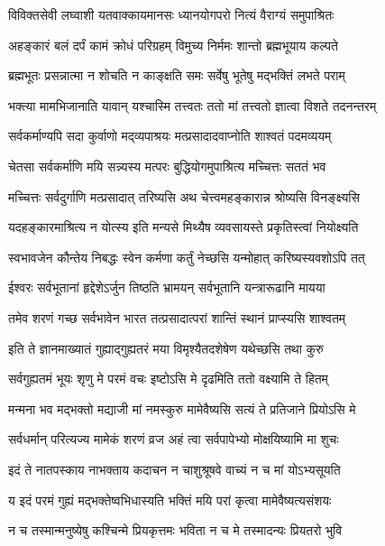 \twolineshloka
{विविक्तसेवी लघ्वाशी यतवाक्कायमानसः}
{ध्यानयोगपरो नित्यं वैराग्यं समुपाश्रितः}%

\twolineshloka
{अहङ्कारं बलं दर्पं कामं क्रोधं परिग्रहम्}
{विमुच्य निर्ममः शान्तो ब्रह्मभूयाय कल्पते}%

\twolineshloka
{ब्रह्मभूतः प्रसन्नात्मा न शोचति न काङ्क्षति}
{समः सर्वेषु भूतेषु मद्भक्तिं लभते पराम्}%

\twolineshloka
{भक्त्या मामभिजानाति यावान् यश्चास्मि तत्त्वतः}
{ततो मां तत्त्वतो ज्ञात्वा विशते तदनन्तरम्}%

\twolineshloka
{सर्वकर्माण्यपि सदा कुर्वाणो मद्‌व्यपाश्रयः}
{मत्प्रसादादवाप्नोति शाश्वतं पदमव्ययम्}%

\twolineshloka
{चेतसा सर्वकर्माणि मयि सन्न्यस्य मत्परः}
{बुद्धियोगमुपाश्रित्य मच्चित्तः सततं भव}%

\twolineshloka
{मच्चित्तः सर्वदुर्गाणि मत्प्रसादात् तरिष्यसि}
{अथ चेत्त्वमहङ्कारान्न श्रोष्यसि विनङ्क्ष्यसि}%

\twolineshloka
{यदहङ्कारमाश्रित्य न योत्स्य इति मन्यसे}
{मिथ्यैष व्यवसायस्ते प्रकृतिस्त्वां नियोक्ष्यति}%

\twolineshloka
{स्वभावजेन कौन्तेय निबद्धः स्वेन कर्मणा}
{कर्तुं नेच्छसि यन्मोहात् करिष्यस्यवशोऽपि तत्}%

\twolineshloka
{ईश्वरः सर्वभूतानां हृद्देशेऽर्जुन तिष्ठति}
{भ्रामयन् सर्वभूतानि यन्त्रारूढानि मायया}%

\twolineshloka
{तमेव शरणं गच्छ सर्वभावेन भारत}
{तत्प्रसादात्परां शान्तिं स्थानं प्राप्स्यसि शाश्वतम्}
{}%

\twolineshloka
{इति ते ज्ञानमाख्यातं गुह्याद्गुह्यतरं मया}
{विमृश्यैतदशेषेण यथेच्छसि तथा कुरु}%

\twolineshloka
{सर्वगुह्यतमं भूयः शृणु मे परमं वचः}
{इष्टोऽसि मे दृढमिति ततो वक्ष्यामि ते हितम्}%

\twolineshloka
{मन्मना भव मद्भक्तो मद्याजी मां नमस्कुरु}
{मामेवैष्यसि सत्यं ते प्रतिजाने प्रियोऽसि मे}%

\twolineshloka
{सर्वधर्मान् परित्यज्य मामेकं शरणं व्रज}
{अहं त्वा सर्वपापेभ्यो मोक्षयिष्यामि मा शुचः}%

\twolineshloka
{इदं ते नातपस्काय नाभक्ताय कदाचन}
{न चाशुश्रूषवे वाच्यं न च मां योऽभ्यसूयति}%

\twolineshloka
{य इदं परमं गुह्यं मद्भक्तेष्वभिधास्यति}
{भक्तिं मयि परां कृत्वा मामेवैष्यत्यसंशयः}%

\twolineshloka
{न च तस्मान्मनुष्येषु कश्चिन्मे प्रियकृत्तमः}
{भविता न च मे तस्मादन्यः प्रियतरो भुवि}%

